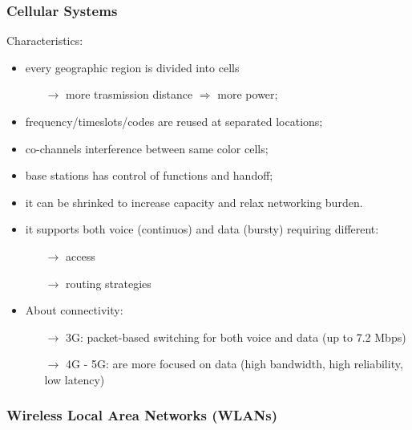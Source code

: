 \subsubsection{Cellular Systems}
Characteristics:
\begin{itemize}
    \setlength\itemsep{0.7em}
    \item every geographic region is divided into cells
    \begin{itemize}
        \item [$\rightarrow$] more trasmission distance $\Rightarrow$
        more power;
    \end{itemize}
    \item frequency/timeslots/codes are reused at separated locations;
    \item co-channels interference between same color cells;
    \item base stations has control of functions and handoff;
    \item it can be shrinked to increase capacity and
    relax networking burden.
    \item it supports both voice (continuos) and data (bursty) requiring
    different:
    \begin{itemize}
        \item[$\rightarrow$] access
        \item[$\rightarrow$] routing strategies 
    \end{itemize}
    \item About connectivity:
    \begin{itemize}
        \item[$\rightarrow$] 3G: packet-based switching for both voice
        and data (up to 7.2 Mbps)
        \item[$\rightarrow$] 4G - 5G: are more focused on data
        (high bandwidth, high reliability, low latency)
    \end{itemize}
\end{itemize}

\subsubsection{Wireless Local Area Networks (WLANs)}

